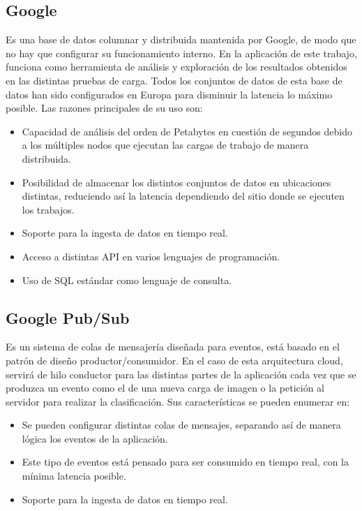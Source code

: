 \subsection{Google }\label{subsec:bigquery}
Es una base de datos columnar y distribuida mantenida por Google, de modo que no hay que configurar su funcionamiento interno.
En la aplicación de este trabajo,  funciona como herramienta de análisis y exploración de los resultados obtenidos en las distintas pruebas de carga.
Todos los conjuntos de datos de esta base de datos han sido configurados en Europa para disminuir la latencia lo máximo posible.
Las razones principales de su uso son:
\begin{itemize}
    \item Capacidad de análisis del orden de Petabytes en cuestión de segundos debido a los múltiples nodos que ejecutan las cargas de trabajo de manera distribuida.
    \item Posibilidad de almacenar los distintos conjuntos de datos en ubicaciones distintas, reduciendo así la latencia dependiendo del sitio donde se ejecuten los trabajos.
    \item Soporte para la ingesta de datos en tiempo real.
    \item Acceso a distintas API en varios lenguajes de programación.
    \item Uso de SQL\cite{sql} estándar como lenguaje de consulta.
\end{itemize}

\subsection{Google Pub/Sub}\label{subsec:pubsub}
Es un sistema de colas de mensajería diseñada para eventos,
está basado en el patrón de diseño productor/consumidor.
En el caso de esta arquitectura cloud, servirá de hilo conductor para las distintas partes de la aplicación cada vez que se produzca un evento como el de una nueva carga de imagen o la petición al servidor para realizar la clasificación.
Sus características se pueden enumerar en:

\begin{itemize}
    \item Se pueden configurar distintas colas de mensajes, separando así de manera lógica los eventos de la aplicación.
    \item Este tipo de eventos está pensado para ser consumido en tiempo real, con la mínima latencia posible.
    \item Soporte para la ingesta de datos en tiempo real.
\end{itemize}

